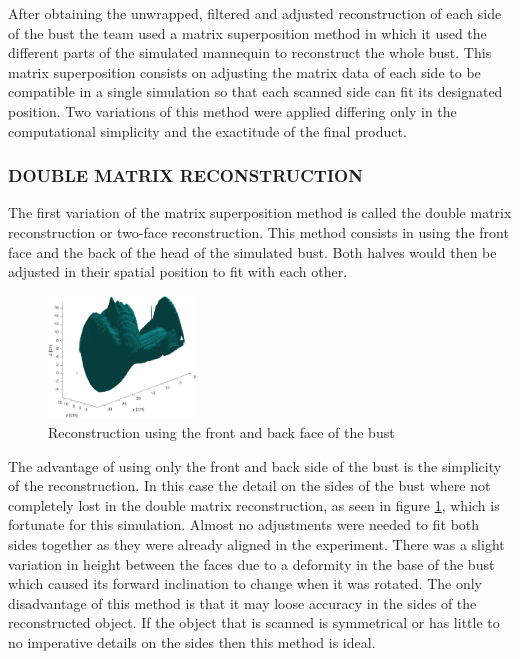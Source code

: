 

After obtaining the unwrapped, filtered and adjusted reconstruction of each side of the bust the team used a matrix superposition method in which it used the different parts of the simulated mannequin to reconstruct the whole bust. This matrix superposition consists on adjusting the matrix data of each side to be compatible in a single simulation so that each scanned side can fit its designated position. Two variations of this method were applied differing only in the computational simplicity and the exactitude of the final product. \\

\subsubsection{DOUBLE MATRIX RECONSTRUCTION}
The first variation of the matrix superposition method is called the double matrix reconstruction or two-face reconstruction. This method consists in using the front face and the back of the head of the simulated bust. Both halves would then be adjusted in their spatial position to fit with each other. \\

\begin{figure}[H]
    \centering
    \includegraphics[width=0.35\textwidth]{Figures/Bust_Face_Sidejpg.jpg}
    \caption{Reconstruction using the front and back face of the bust}
    \label{fig:Double}
\end{figure}

The advantage of using only the front and back side of the bust is the simplicity of the reconstruction. In this case the detail on the sides of the bust where not completely lost in the double matrix reconstruction, as seen in figure \ref{fig:Double}, which is fortunate for this simulation. Almost no adjustments were needed to fit both sides together as they were already aligned in the experiment. There was a slight variation in height between the faces due to a deformity in the base of the bust which caused its forward inclination to change when it was rotated. The only disadvantage of this method is that it may loose accuracy in the sides of the reconstructed object. If the object that is scanned is symmetrical or has little to no imperative details on the sides then this method is ideal. \\

